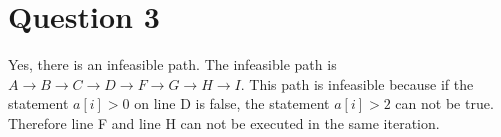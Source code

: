 \section{Question 3}

    Yes, there is an infeasible path. The infeasible path is $A\rightarrow B\rightarrow C\rightarrow D\rightarrow F\rightarrow G\rightarrow H\rightarrow I$. This path is infeasible because if the statement $a[i] > 0$ on line D is false, the statement $a[i] > 2$ can not be true. Therefore line F and line H can not be executed in the same iteration.